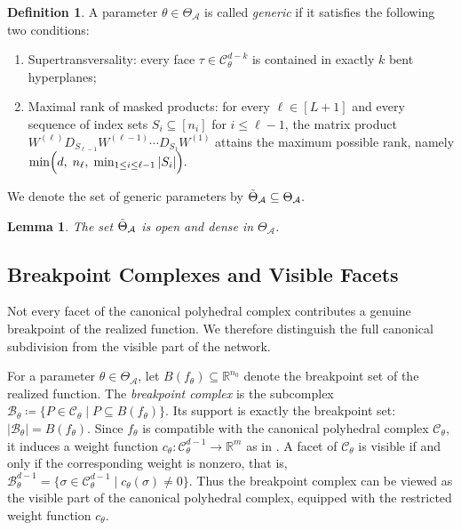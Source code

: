\documentclass{article}
\newtheorem{lemma}[theorem]{Lemma}
\theoremstyle{definition}
\newtheorem{definition}[theorem]{Definition}
\newcommand{\R}{\mathbb{R}}
\newcommand{\architecture}{\mathcal{A}}
\newcommand{\paramspace}[1]{\Theta_{#1}}
\newcommand{\gparamspace}[1]{\Tilde{\Theta}_{#1}}
\newcommand{\weights}[1]{W^{(#1)}}
\newcommand{\complex}{\mathcal{C}}
\newcommand{\breakpoints}[1]{B({#1})}
\newcommand{\bcomplex}[1]{\mathcal{B}_{#1}}
\begin{document}
\begin{definition}
\label{def:generic_parameter}
A parameter $\theta \in \paramspace{\architecture}$ is called \emph{generic} if it satisfies the
following two conditions:
\begin{enumerate}[leftmargin=*]
    \item {Supertransversality:} every face $\tau \in \complex_\theta^{d-k}$ is contained in
    exactly $k$ bent hyperplanes;

    \item {Maximal rank of masked products:} for every $\ell \in [L+1]$ and every sequence of
    index sets $S_i \subseteq [n_i]$ for $i \le \ell-1$, the matrix product
    $
    \weights{\ell} D_{S_{\ell-1}} \weights{\ell-1}\cdots D_{S_1}\weights{1}
    $
    attains the maximum possible rank, namely
    $
    \min\Bigl(d,\; n_\ell,\; \min_{1\le i\le \ell-1}|S_i|\Bigr).
    $
\end{enumerate}
We denote the set of generic parameters by
$
\gparamspace{\architecture}\subseteq\paramspace{\architecture}.
$
\end{definition}

\begin{lemma}
\label{lem:generic_open_dense}
The set $\gparamspace{\architecture}$ is open and dense in $\paramspace{\architecture}$.
\end{lemma}


\subsection{Breakpoint Complexes and Visible Facets}
\label{app:breakpoint_complex}

Not every facet of the canonical polyhedral complex contributes a genuine breakpoint of the realized
function. We therefore distinguish the full canonical subdivision from the visible part of the
network.

For a parameter $\theta\in\paramspace{\architecture}$, let
$
\breakpoints{f_\theta}
\subseteq \R^{n_0}
$
denote the breakpoint set of the realized function.
The \emph{breakpoint complex} is the subcomplex
$
\bcomplex{\theta}
\coloneqq
\{P\in\complex_\theta \mid P\subseteq \breakpoints{f_\theta}\}.
$
Its support is exactly the breakpoint set:
$
|\bcomplex{\theta}|=\breakpoints{f_\theta}.
$
Since $f_\theta$ is compatible with the canonical polyhedral complex $\complex_\theta$, it induces a
weight function
$
c_\theta \colon \complex_\theta^{d-1}\to\R^m
$
as in . A facet of $\complex_\theta$ is visible if and
only if the corresponding weight is nonzero, that is,
$
\bcomplex{\theta}^{d-1}
=
\{\sigma\in\complex_\theta^{d-1}\mid c_\theta(\sigma)\neq 0\}
$. 
Thus the breakpoint complex can be viewed as the visible part of the canonical polyhedral complex,
equipped with the restricted weight function $c_\theta$. 
\end{document}
